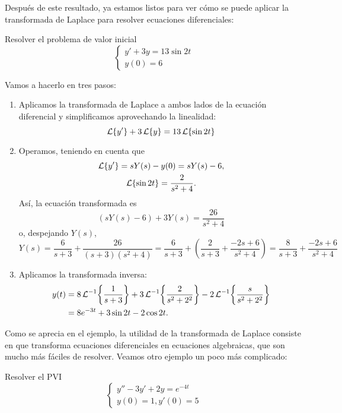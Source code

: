 \documentclass[../ecuaciones_diferenciales.tex]{subfiles}
\begin{document}
Después de este resultado, ya estamos listos para ver cómo se puede aplicar la
transformada de Laplace para resolver ecuaciones diferenciales:

\begin{example}
	Resolver el problema de valor inicial
	\[
		\begin{cases}
			y' + 3y = 13 \sin 2t \\
			y(0) = 6
		\end{cases}
	\]
\end{example}

\begin{solution}
	Vamos a hacerlo en tres pasos:
	\begin{enumerate}[(1)]
		\item Aplicamos la transformada de Laplace a ambos lados de la ecuación
		      diferencial y simplificamos aprovechando la linealidad:
		      \[\operatorname{\mathcal{L}}\{y'\} + 3\operatorname{\mathcal{L}}\{y\} = 13\operatorname{\mathcal{L}}\{\sin 2t\}\]
		\item Operamos, teniendo en cuenta que
		      \begin{gather*}
			      \operatorname{\mathcal{L}}\{y'\} = sY(s) - y(0) = sY(s) -  6, \\
			      \operatorname{\mathcal{L}}\{\sin 2t\} = \frac{2}{s^2+4}.
		      \end{gather*}
		      Así, la ecuación transformada es
		      \[(sY(s) - 6) + 3Y(s) = \frac{26}{s^2+4}\]
		      o, despejando \(Y(s)\),
		      \[
			      Y(s) = \frac{6}{s+3} + \frac{26}{(s+3)(s^2+4)} = \frac{6}{s+3} + \left(
			      \frac{2}{s+3} + \frac{-2s+6}{s^2+4} \right) = \frac{8}{s+3} + \frac{-2s+6}{s^2+4}
		      \]
		\item Aplicamos la transformada inversa:
		      \begin{align*}
			      y(t) & = 8 \laplace^{-1}\left\{\frac{1}{s+3}\right\} + 3
			      \laplace^{-1}\left\{\frac{2}{s^2+2^2}\right\} -2
			      \laplace^{-1}\left\{\frac{s}{s^2+2^2}\right\}            \\
			           & = 8e^{-3t} + 3\sin 2t - 2\cos 2t.
		      \end{align*}
	\end{enumerate}
\end{solution}

Como se aprecia en el ejemplo, la utilidad de la transformada de Laplace consiste
en que transforma ecuaciones diferenciales en ecuaciones algebraicas, que son
mucho más fáciles de resolver. Veamos otro ejemplo un poco más complicado:

\begin{example}
	Resolver el PVI
	\[
		\begin{cases}
			y'' - 3y' + 2y = e^{-4t} \\
			y(0) = 1, y'(0) = 5
		\end{cases}
	\]
\end{example}
\end{document}
